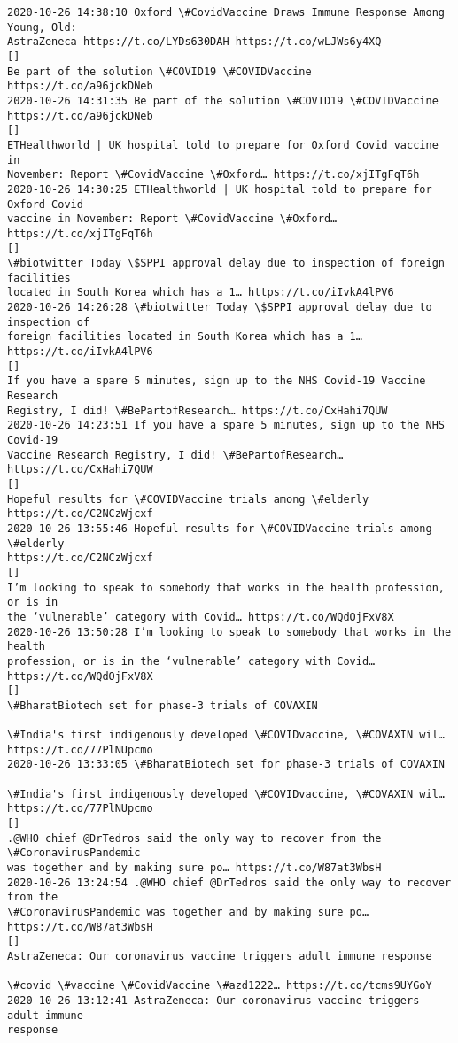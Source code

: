 \documentclass[11pt]{article}
\begin{document}
\begin{Verbatim}[commandchars=\\\{\}]
2020-10-26 14:38:10 Oxford \#CovidVaccine Draws Immune Response Among Young, Old:
AstraZeneca https://t.co/LYDs630DAH https://t.co/wLJWs6y4XQ
[]
Be part of the solution \#COVID19 \#COVIDVaccine  https://t.co/a96jckDNeb
2020-10-26 14:31:35 Be part of the solution \#COVID19 \#COVIDVaccine
https://t.co/a96jckDNeb
[]
ETHealthworld | UK hospital told to prepare for Oxford Covid vaccine in
November: Report \#CovidVaccine \#Oxford… https://t.co/xjITgFqT6h
2020-10-26 14:30:25 ETHealthworld | UK hospital told to prepare for Oxford Covid
vaccine in November: Report \#CovidVaccine \#Oxford… https://t.co/xjITgFqT6h
[]
\#biotwitter Today \$SPPI approval delay due to inspection of foreign facilities
located in South Korea which has a 1… https://t.co/iIvkA4lPV6
2020-10-26 14:26:28 \#biotwitter Today \$SPPI approval delay due to inspection of
foreign facilities located in South Korea which has a 1… https://t.co/iIvkA4lPV6
[]
If you have a spare 5 minutes, sign up to the NHS Covid-19 Vaccine Research
Registry, I did! \#BePartofResearch… https://t.co/CxHahi7QUW
2020-10-26 14:23:51 If you have a spare 5 minutes, sign up to the NHS Covid-19
Vaccine Research Registry, I did! \#BePartofResearch… https://t.co/CxHahi7QUW
[]
Hopeful results for \#COVIDVaccine trials among \#elderly https://t.co/C2NCzWjcxf
2020-10-26 13:55:46 Hopeful results for \#COVIDVaccine trials among \#elderly
https://t.co/C2NCzWjcxf
[]
I’m looking to speak to somebody that works in the health profession, or is in
the ‘vulnerable’ category with Covid… https://t.co/WQdOjFxV8X
2020-10-26 13:50:28 I’m looking to speak to somebody that works in the health
profession, or is in the ‘vulnerable’ category with Covid…
https://t.co/WQdOjFxV8X
[]
\#BharatBiotech set for phase-3 trials of COVAXIN

\#India's first indigenously developed \#COVIDvaccine, \#COVAXIN wil…
https://t.co/77PlNUpcmo
2020-10-26 13:33:05 \#BharatBiotech set for phase-3 trials of COVAXIN

\#India's first indigenously developed \#COVIDvaccine, \#COVAXIN wil…
https://t.co/77PlNUpcmo
[]
.@WHO chief @DrTedros said the only way to recover from the \#CoronavirusPandemic
was together and by making sure po… https://t.co/W87at3WbsH
2020-10-26 13:24:54 .@WHO chief @DrTedros said the only way to recover from the
\#CoronavirusPandemic was together and by making sure po… https://t.co/W87at3WbsH
[]
AstraZeneca: Our coronavirus vaccine triggers adult immune response

\#covid \#vaccine \#CovidVaccine \#azd1222… https://t.co/tcms9UYGoY
2020-10-26 13:12:41 AstraZeneca: Our coronavirus vaccine triggers adult immune
response


\end{Verbatim}
\end{document}
